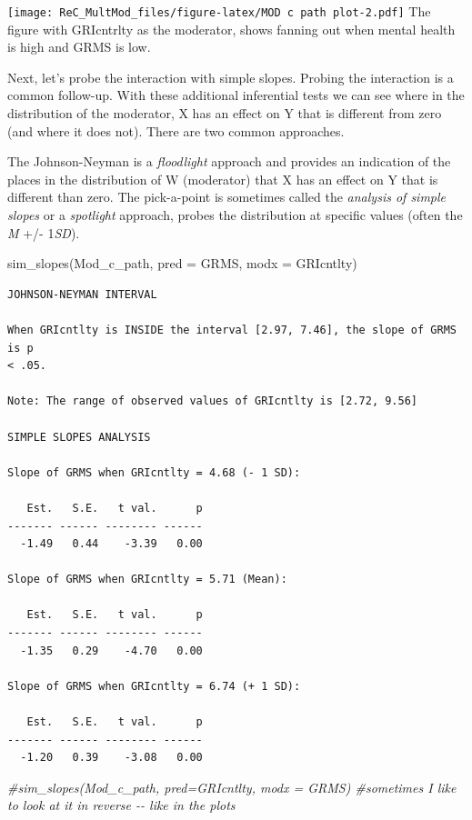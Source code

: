 \documentclass[
  11pt,
]{book}
\newenvironment{Shaded}{\begin{snugshade}}{\end{snugshade}}
\newcommand{\AttributeTok}[1]{\textcolor[rgb]{0.77,0.63,0.00}{#1}}
\newcommand{\CommentTok}[1]{\textcolor[rgb]{0.56,0.35,0.01}{\textit{#1}}}
\newcommand{\FunctionTok}[1]{\textcolor[rgb]{0.00,0.00,0.00}{#1}}
\newcommand{\NormalTok}[1]{#1}
\begin{document}
\texttt{[image: ReC\_MultMod\_files/figure-latex/MOD c path plot-2.pdf]}
The figure with GRIcntrlty as the moderator, shows fanning out when mental health is high and GRMS is low.

Next, let's probe the interaction with simple slopes. Probing the interaction is a common follow-up. With these additional inferential tests we can see where in the distribution of the moderator, X has an effect on Y that is different from zero (and where it does not). There are two common approaches.

The Johnson-Neyman is a \emph{floodlight} approach and provides an indication of the places in the distribution of W (moderator) that X has an effect on Y that is different than zero. The pick-a-point is sometimes called the \emph{analysis of simple slopes} or a \emph{spotlight} approach, probes the distribution at specific values (often the \emph{M} +/- 1\emph{SD}).

\begin{Shaded}
\begin{Highlighting}[]
\FunctionTok{sim\_slopes}\NormalTok{(Mod\_c\_path, }\AttributeTok{pred =}\NormalTok{ GRMS, }\AttributeTok{modx =}\NormalTok{ GRIcntlty)}
\end{Highlighting}
\end{Shaded}

\begin{verbatim}
JOHNSON-NEYMAN INTERVAL 

When GRIcntlty is INSIDE the interval [2.97, 7.46], the slope of GRMS is p
< .05.

Note: The range of observed values of GRIcntlty is [2.72, 9.56]

SIMPLE SLOPES ANALYSIS 

Slope of GRMS when GRIcntlty = 4.68 (- 1 SD): 

   Est.   S.E.   t val.      p
------- ------ -------- ------
  -1.49   0.44    -3.39   0.00

Slope of GRMS when GRIcntlty = 5.71 (Mean): 

   Est.   S.E.   t val.      p
------- ------ -------- ------
  -1.35   0.29    -4.70   0.00

Slope of GRMS when GRIcntlty = 6.74 (+ 1 SD): 

   Est.   S.E.   t val.      p
------- ------ -------- ------
  -1.20   0.39    -3.08   0.00
\end{verbatim}

\begin{Shaded}
\begin{Highlighting}[]
\CommentTok{\#sim\_slopes(Mod\_c\_path, pred=GRIcntlty, modx = GRMS) \#sometimes I like to look at it in reverse {-}{-} like in the plots}
\end{Highlighting}
\end{Shaded}
\end{document}
